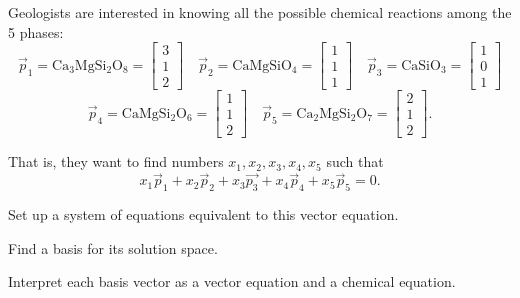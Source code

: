 \begin{activity}{15}
Geologists are interested in knowing all the possible chemical reactions among the 5 phases:
\[ \vec{p}_1 = \mathrm{Ca_3MgSi_2O_8} = \begin{bmatrix} 3 \\ 1 \\ 2 \end{bmatrix} \hspace{1em}
\vec{p}_2 = \mathrm{CaMgSiO_4} = \begin{bmatrix} 1 \\ 1 \\ 1 \end{bmatrix} \hspace{1em}
\vec{p}_3 = \mathrm{CaSiO_3} =  \begin{bmatrix} 1 \\ 0 \\ 1 \end{bmatrix}\]
\[\vec{p}_4 = \mathrm{CaMgSi_2O_6} = \begin{bmatrix} 1 \\ 1 \\ 2 \end{bmatrix} \hspace{1em}
\vec{p}_5 = \mathrm{Ca_2MgSi_2O_7} = \begin{bmatrix} 2 \\ 1 \\ 2 \end{bmatrix}.\]

That is, they want to find numbers \(x_1,x_2,x_3,x_4,x_5\) such that 
\[x_1\vec{p}_1+x_2\vec{p}_2+x_3\vec{p_3}+x_4\vec{p}_4+x_5\vec{p}_5 = 0.\]

\begin{subactivity}
Set up a system of equations equivalent to this vector equation.
\end{subactivity}
\begin{subactivity}
Find a basis for its solution space.
\end{subactivity}
\begin{subactivity}
Interpret each basis vector as a vector equation and a chemical equation.
\end{subactivity}

\end{activity}

